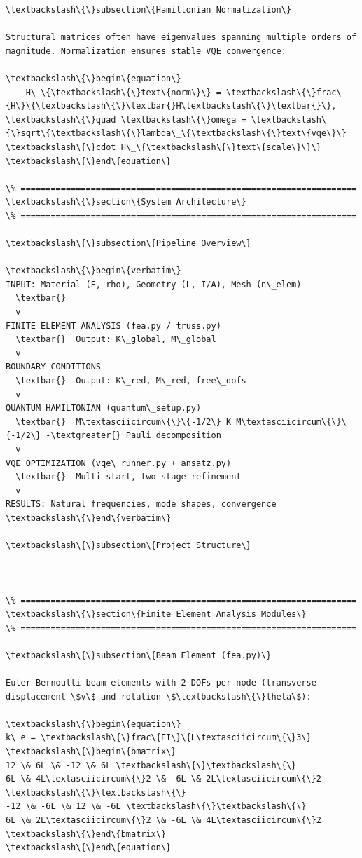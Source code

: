\documentclass[12pt, a4paper]{article}
\begin{document}
\begin{lstlisting}[style=codestyle, caption={VQA\_Modal\_Analysis\_Report.tex}]
\textbackslash\{\}subsection\{Hamiltonian Normalization\}

Structural matrices often have eigenvalues spanning multiple orders of magnitude. Normalization ensures stable VQE convergence:

\textbackslash\{\}begin\{equation\}
    H\_\{\textbackslash\{\}text\{norm\}\} = \textbackslash\{\}frac\{H\}\{\textbackslash\{\}\textbar{}H\textbackslash\{\}\textbar{}\}, \textbackslash\{\}quad \textbackslash\{\}omega = \textbackslash\{\}sqrt\{\textbackslash\{\}lambda\_\{\textbackslash\{\}text\{vqe\}\} \textbackslash\{\}cdot H\_\{\textbackslash\{\}text\{scale\}\}\}
\textbackslash\{\}end\{equation\}

\% ===================================================================
\textbackslash\{\}section\{System Architecture\}
\% ===================================================================

\textbackslash\{\}subsection\{Pipeline Overview\}

\textbackslash\{\}begin\{verbatim\}
INPUT: Material (E, rho), Geometry (L, I/A), Mesh (n\_elem)
  \textbar{}
  v
FINITE ELEMENT ANALYSIS (fea.py / truss.py)
  \textbar{}  Output: K\_global, M\_global
  v
BOUNDARY CONDITIONS
  \textbar{}  Output: K\_red, M\_red, free\_dofs
  v
QUANTUM HAMILTONIAN (quantum\_setup.py)
  \textbar{}  M\textasciicircum\{\}\{-1/2\} K M\textasciicircum\{\}\{-1/2\} -\textgreater{} Pauli decomposition
  v
VQE OPTIMIZATION (vqe\_runner.py + ansatz.py)
  \textbar{}  Multi-start, two-stage refinement
  v
RESULTS: Natural frequencies, mode shapes, convergence
\textbackslash\{\}end\{verbatim\}

\textbackslash\{\}subsection\{Project Structure\}



\% ===================================================================
\textbackslash\{\}section\{Finite Element Analysis Modules\}
\% ===================================================================

\textbackslash\{\}subsection\{Beam Element (fea.py)\}

Euler-Bernoulli beam elements with 2 DOFs per node (transverse displacement \$v\$ and rotation \$\textbackslash\{\}theta\$):

\textbackslash\{\}begin\{equation\}
k\_e = \textbackslash\{\}frac\{EI\}\{L\textasciicircum\{\}3\}
\textbackslash\{\}begin\{bmatrix\}
12 \& 6L \& -12 \& 6L \textbackslash\{\}\textbackslash\{\}
6L \& 4L\textasciicircum\{\}2 \& -6L \& 2L\textasciicircum\{\}2 \textbackslash\{\}\textbackslash\{\}
-12 \& -6L \& 12 \& -6L \textbackslash\{\}\textbackslash\{\}
6L \& 2L\textasciicircum\{\}2 \& -6L \& 4L\textasciicircum\{\}2
\textbackslash\{\}end\{bmatrix\}
\textbackslash\{\}end\{equation\}


\end{lstlisting}
\end{document}
